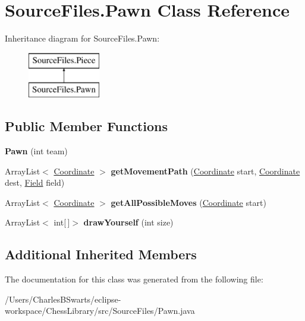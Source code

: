 \hypertarget{class_source_files_1_1_pawn}{}\section{Source\+Files.\+Pawn Class Reference}
\label{class_source_files_1_1_pawn}
Inheritance diagram for Source\+Files.\+Pawn\+:\begin{figure}[H]
\begin{center}
\leavevmode
\includegraphics[height=2.000000cm]{class_source_files_1_1_pawn}
\end{center}
\end{figure}
\subsection*{Public Member Functions}
\begin{DoxyCompactItemize}
\item 
\mbox{\label{class_source_files_1_1_pawn_ac2fee5b5a4ecfe6863eab93c4222e1ad}} 
{\bfseries Pawn} (int team)
\item 
\mbox{\label{class_source_files_1_1_pawn_a7f49a265bc09fe040dab5328d1ffa41e}} 
Array\+List$<$ \mbox{\hyperlink{class_source_files_1_1_coordinate}{Coordinate}} $>$ {\bfseries get\+Movement\+Path} (\mbox{\hyperlink{class_source_files_1_1_coordinate}{Coordinate}} start, \mbox{\hyperlink{class_source_files_1_1_coordinate}{Coordinate}} dest, \mbox{\hyperlink{class_source_files_1_1_field}{Field}} field)
\item 
\mbox{\label{class_source_files_1_1_pawn_aa7318cf3aaeefdf1fe5f508dbd0d1e56}} 
Array\+List$<$ \mbox{\hyperlink{class_source_files_1_1_coordinate}{Coordinate}} $>$ {\bfseries get\+All\+Possible\+Moves} (\mbox{\hyperlink{class_source_files_1_1_coordinate}{Coordinate}} start)
\item 
\mbox{\label{class_source_files_1_1_pawn_ae78004729d2966d6b2f827ab200c4415}} 
Array\+List$<$ int\mbox{[}$\,$\mbox{]}$>$ {\bfseries draw\+Yourself} (int size)
\end{DoxyCompactItemize}
\subsection*{Additional Inherited Members}


The documentation for this class was generated from the following file\+:\begin{DoxyCompactItemize}
\item 
/\+Users/\+Charles\+B\+Swarts/eclipse-\/workspace/\+Chess\+Library/src/\+Source\+Files/Pawn.\+java\end{DoxyCompactItemize}

